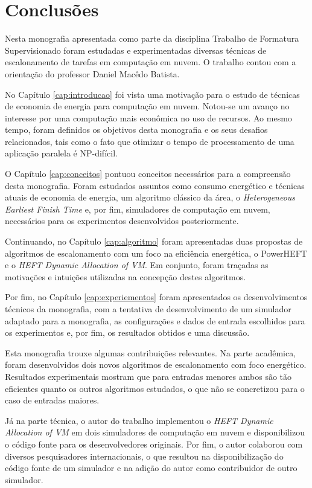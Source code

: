 \chapter{Conclusões}
\label{cap:conclusoes}

Nesta monografia apresentada como parte da disciplina Trabalho de Formatura
Supervisionado foram estudadas e experimentadas diversas técnicas de
escalonamento de tarefas em computação em nuvem. O trabalho contou com a
orientação do professor Daniel Macêdo Batista.

No Capítulo \ref{cap:introducao} foi vista uma motivação para o estudo de
técnicas de economia de energia para computação em nuvem. Notou-se um
avanço no interesse por uma computação mais econômica no uso de recursos. Ao
mesmo tempo, foram definidos os objetivos desta monografia e os seus desafios
relacionados, tais como o fato que otimizar o tempo de processamento de uma
aplicação paralela é NP-difícil.

O Capítulo \ref{cap:conceitos} pontuou conceitos necessários para a compreensão
desta monografia. Foram estudados assuntos como consumo energético e técnicas
atuais de economia de energia, um algoritmo clássico da área, o
\emph{Heterogeneous Earliest Finish Time} e, por fim, simuladores de computação
em nuvem, necessários para os experimentos desenvolvidos posteriormente.

Continuando, no Capítulo \ref{cap:algoritmo} foram apresentadas duas propostas
de algoritmos de escalonamento com um foco na eficiência energética, o PowerHEFT
e o \emph{HEFT Dynamic Allocation of VM}. Em conjunto, foram traçadas as
motivações e intuições utilizadas na concepção destes algoritmos.

Por fim, no Capítulo \ref{cap:experiementos} foram apresentados os
desenvolvimentos técnicos da monografia, com a tentativa de desenvolvimento de
um simulador adaptado para a monografia, as configurações e dados de entrada
escolhidos para os experimentos e, por fim, os resultados obtidos e uma
discussão.

Esta monografia trouxe algumas contribuições relevantes. Na parte acadêmica,
foram desenvolvidos dois novos algoritmos de escalonamento com foco energético.
Resultados experimentais mostram que para entradas menores ambos são
tão eficientes quanto os outros algoritmos estudados, o que não se concretizou
para o caso de entradas maiores.

Já na parte técnica, o autor do trabalho implementou o \emph{HEFT Dynamic
Allocation of VM} em dois simuladores de computação em nuvem e disponibilizou o 
código fonte para os desenvolvedores originais. Por fim, o autor colaborou
com diversos pesquisadores internacionais, o que resultou na disponibilização
do código fonte de um simulador e na adição do autor como contribuidor de outro
simulador.

